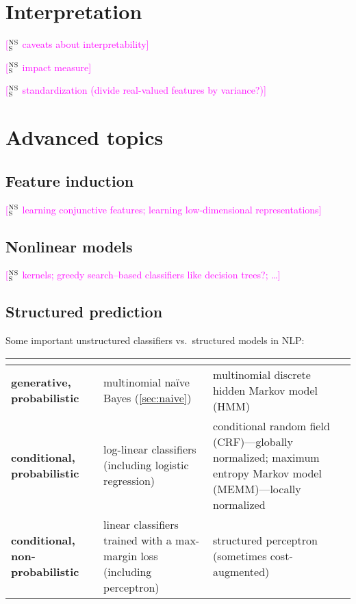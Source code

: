 \documentclass[11pt,letterpaper]{article}
\newcommand{\ensuretext}[1]{#1}
\newcommand{\nssmarker}{\ensuretext{\textcolor{magenta}{\ensuremath{^{\textsc{NS}}_{\textsc{S}}}}}}
\newcommand{\arkcomment}[3]{\ensuretext{\textcolor{#3}{[#1 #2]}}}
\newcommand{\nss}[1]{\arkcomment{\nssmarker}{#1}{magenta}}
\begin{document}





\section{Interpretation}\label{sec:interp}

\nss{caveats about interpretability}

\nss{impact measure}

\nss{standardization (divide real-valued features by variance?)}

\section{Advanced topics}

\subsection{Feature induction}\label{sec:induction}

\nss{learning conjunctive features; learning low-dimensional representations}

\subsection{Nonlinear models}

\nss{kernels; greedy search--based classifiers like decision trees?; \ldots}

\subsection{Structured prediction}

Some important unstructured classifiers vs.~structured models in NLP:

\begin{center}\small
\begin{tabular}{@{}>{\raggedright\bf}p{9em}>{\raggedright}p{13em}@{~~}>{\raggedright\arraybackslash}p{16em}@{}}
& \multicolumn{1}{c}{Unstructured} & \multicolumn{1}{c}{Sequence} \\
\hline
generative, probabilistic & multinomial na\"{i}ve Bayes (\cref{sec:naive}) & {\raggedright multinomial discrete hidden Markov model (HMM)} \\
\hline
conditional, probabilistic & log-linear classifiers (including logistic regression) & conditional random field (CRF)---globally normalized; 
maximum entropy Markov model (MEMM)---locally normalized \\
\hline
conditional, non-probabilistic & linear classifiers trained with a max-margin loss (including perceptron) & structured perceptron \citep{collins-02} (sometimes cost-augmented) \\
\hline
\end{tabular}
\end{center}
\end{document}
